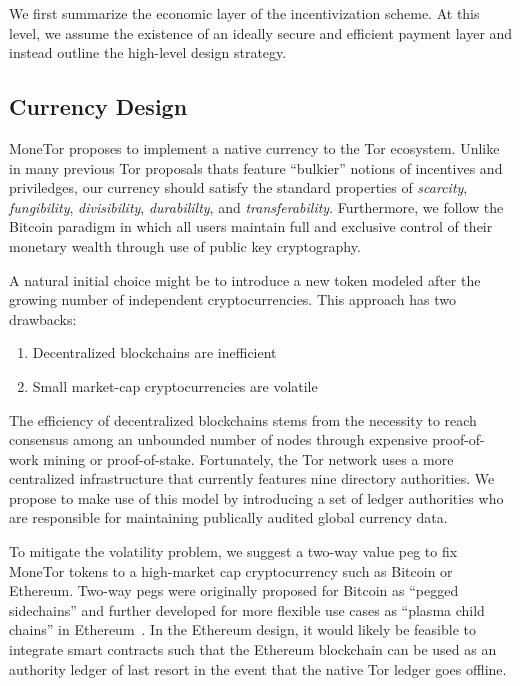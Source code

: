 We first summarize the economic layer of the incentivization scheme. At this
level, we assume the existence of an ideally secure and efficient payment layer
and instead outline the high-level design strategy.

\subsection{Currency Design}

MoneTor proposes to implement a native currency to the Tor ecosystem. Unlike in
many previous Tor proposals thats feature ``bulkier'' notions of incentives and
priviledges, our currency should satisfy the standard properties of \textit{scarcity},
\textit{fungibility}, \textit{divisibility}, \textit{durabililty}, and \textit{transferability}. 
Furthermore, we
follow the Bitcoin paradigm in which all users maintain full and exclusive
control of their monetary wealth through use of public key cryptography.

A natural initial choice might be to introduce a new token modeled after the
growing number of independent cryptocurrencies. This approach has two drawbacks:

\begin{enumerate}
\item Decentralized blockchains are inefficient
\item Small market-cap cryptocurrencies are volatile 
\end{enumerate}

The efficiency of decentralized blockchains stems from the necessity to reach
consensus among an unbounded number of nodes through expensive proof-of-work
mining or proof-of-stake. Fortunately, the Tor network uses a more centralized
infrastructure that currently features nine directory authorities. We propose to
make use of this model by introducing a set of ledger authorities who are
responsible for maintaining publically audited global currency data.

To mitigate the volatility problem, we suggest a two-way value peg to fix
MoneTor tokens to a high-market cap cryptocurrency such as Bitcoin or
Ethereum. 
Two-way pegs were originally proposed for Bitcoin as ``pegged
sidechains'' and further developed for more flexible use cases as ``plasma child
chains'' in Ethereum~\cite{back2014enabling, poon2017plasma}. In the
Ethereum design, it would likely be feasible to integrate smart contracts such
that the Ethereum blockchain can be used as an authority ledger of last resort
in the event that the native Tor ledger goes offline.

